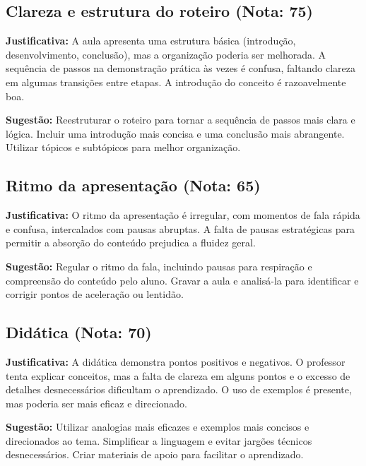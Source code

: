 \documentclass{memoir}%
\begin{document}
\subsection*{Clareza e estrutura do roteiro (Nota: 75)}%
\textbf{Justificativa:} A aula apresenta uma estrutura básica (introdução, desenvolvimento, conclusão), mas a organização poderia ser melhorada. A sequência de passos na demonstração prática às vezes é confusa,  faltando clareza em algumas transições entre etapas. A introdução do conceito é razoavelmente boa.%
\par%
\textbf{Sugestão:} Reestruturar o roteiro para tornar a sequência de passos mais clara e lógica.  Incluir uma introdução mais concisa e uma conclusão mais abrangente.  Utilizar tópicos e subtópicos para melhor organização.%
\par%
\vspace{0.3cm}%
\subsection*{Ritmo da apresentação (Nota: 65)}%
\textbf{Justificativa:} O ritmo da apresentação é irregular, com momentos de fala rápida e confusa, intercalados com pausas abruptas.  A falta de pausas estratégicas para permitir a absorção do conteúdo prejudica a fluidez geral.%
\par%
\textbf{Sugestão:} Regular o ritmo da fala, incluindo pausas para respiração e compreensão do conteúdo pelo aluno.  Gravar a aula e analisá-la para identificar e corrigir pontos de aceleração ou lentidão.%
\par%
\vspace{0.3cm}%
\subsection*{Didática (Nota: 70)}%
\textbf{Justificativa:} A didática demonstra pontos positivos e negativos. O professor tenta explicar conceitos, mas a falta de clareza em alguns pontos e o excesso de detalhes desnecessários dificultam o aprendizado. O uso de exemplos é presente, mas poderia ser mais eficaz e direcionado.%
\par%
\textbf{Sugestão:} Utilizar analogias mais eficazes e exemplos mais concisos e direcionados ao tema.  Simplificar a linguagem e evitar jargões técnicos desnecessários. Criar materiais de apoio para facilitar o aprendizado.%
\par%
\vspace{0.3cm}%
\end{document}
